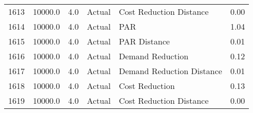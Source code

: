 \begin{longtable}{lrrllr}
1613 &      10000.0 &     4.0 &         Actual &    Cost Reduction Distance &   0.00 \\
1614 &      10000.0 &     4.0 &         Actual &                        PAR &   1.04 \\
1615 &      10000.0 &     4.0 &         Actual &               PAR Distance &   0.01 \\
1616 &      10000.0 &     4.0 &         Actual &           Demand Reduction &   0.12 \\
1617 &      10000.0 &     4.0 &         Actual &  Demand Reduction Distance &   0.01 \\
1618 &      10000.0 &     4.0 &         Actual &             Cost Reduction &   0.13 \\
1619 &      10000.0 &     4.0 &         Actual &    Cost Reduction Distance &   0.00 \\
\end{longtable}

